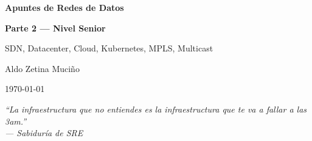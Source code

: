 \documentclass[12pt, a4paper, openany]{book}
\begin{document}
\pagecolor{darkbg}
\color{textlight}
\makeatletter
{}
\def\normalcolor{\color{normalcolor@tmp}}
\makeatother

\renewcommand{\chaptermark}[1]{\markboth{\chaptername\ \thechapter.\ #1}{}}
\renewcommand{\sectionmark}[1]{\markright{\thesection.\ #1}}

\begin{titlepage}
    \centering
    \vspace*{2cm}
    {\Huge\bfseries {} Apuntes de Redes de Datos\par}
    \vspace{0.5cm}
    {\Large\bfseries Parte 2 --- Nivel Senior\par}
    \vspace{1cm}
    {\large SDN, Datacenter, Cloud, Kubernetes, MPLS, Multicast\par}
    \vspace{0.5cm}
    {\large Aldo Zetina Muciño\par}
    \vspace{0.5cm}
    {\normalsize \today\par}
    \vspace{2cm}
    {\large\itshape ``La infraestructura que no entiendes es la infraestructura que te va a fallar a las 3am.''\\[4pt]
    --- Sabiduría de SRE\par}
\end{titlepage}

\tableofcontents
\newpage










\end{document}
